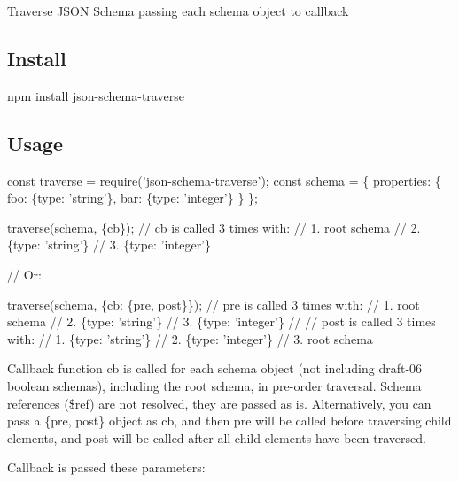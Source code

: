 Traverse J\+S\+ON Schema passing each schema object to callback

\href{https://travis-ci.org/epoberezkin/json-schema-traverse}{\tt } \href{https://www.npmjs.com/package/json-schema-traverse}{\tt } \href{https://coveralls.io/github/epoberezkin/json-schema-traverse?branch=master}{\tt }

\subsection*{Install}


\begin{DoxyCode}
npm install json-schema-traverse
\end{DoxyCode}


\subsection*{Usage}


\begin{DoxyCode}
const traverse = require('json-schema-traverse');
const schema = \{
  properties: \{
    foo: \{type: 'string'\},
    bar: \{type: 'integer'\}
  \}
\};

traverse(schema, \{cb\});
// cb is called 3 times with:
// 1. root schema
// 2. \{type: 'string'\}
// 3. \{type: 'integer'\}

// Or:

traverse(schema, \{cb: \{pre, post\}\});
// pre is called 3 times with:
// 1. root schema
// 2. \{type: 'string'\}
// 3. \{type: 'integer'\}
//
// post is called 3 times with:
// 1. \{type: 'string'\}
// 2. \{type: 'integer'\}
// 3. root schema
\end{DoxyCode}


Callback function {\ttfamily cb} is called for each schema object (not including draft-\/06 boolean schemas), including the root schema, in pre-\/order traversal. Schema references (\$ref) are not resolved, they are passed as is. Alternatively, you can pass a {\ttfamily \{pre, post\}} object as {\ttfamily cb}, and then {\ttfamily pre} will be called before traversing child elements, and {\ttfamily post} will be called after all child elements have been traversed.

Callback is passed these parameters\+:


